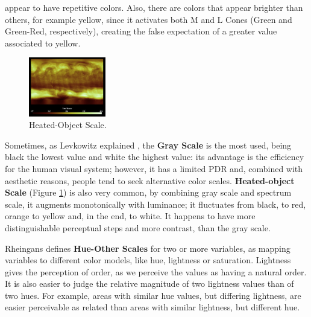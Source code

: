 appear to have repetitive colors. Also, there are colors that appear brighter than
others, for example yellow, since it activates both M and L Cones (Green and Green-Red, respectively), creating
the false expectation of a greater value associated to yellow. \par
%
\begin{figure}
	\centering
    \vspace{-10pt}
    \includegraphics[width=0.3\textwidth]{images/background/HeatedObjectScale.png}
    \caption[Heated-Object Scale Example]{Heated-Object Scale. \protect\cite{Rheingans2000}}
    \label{fig:heatedobject}
\end{figure}
%
Sometimes, as Levkowitz explained \cite{Levkowitz1996}, the \textbf{Gray Scale} is the most used,
being black the lowest value and white the highest value: its advantage is the efficiency for the human
visual system; however, it has a limited PDR and, combined with aesthetic reasons, people tend to seek
alternative color scales. \textbf{Heated-object Scale} (Figure \ref{fig:heatedobject}) is also very
common, by combining gray scale and
spectrum scale, it augments monotonically with luminance; it fluctuates from black, to red, orange to yellow
and, in the end, to white. It happens to have more distinguishable perceptual steps and more contrast, than
the gray scale. \par
%
Rheingans defines \textbf{Hue-Other Scales} for two or more variables, as mapping variables to
different color models, like hue, lightness or saturation. Lightness
gives the perception of order, as we perceive the values as having a natural order. It is also easier to
judge the relative magnitude of two lightness values than of two hues. For example, areas with similar hue
values, but differing lightness, are easier perceivable as related than areas with similar lightness, but
different hue.
%
